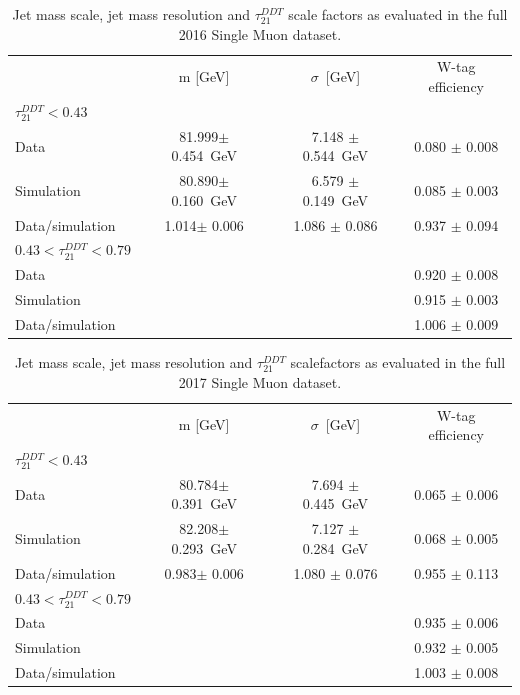 \begin{table}[htbp]
    \centering
    \begin{tabular}{|lccc|}
    \hline
    & m [GeV]           & $\sigma$~[GeV]     & W-tag efficiency\\
    $\tau_{21}^{DDT} < 0.43$ & &&\\ \hline
    \hline
    Data            & 81.999$\pm$ 0.454~GeV   & 7.148 $\pm$ 0.544~GeV & 0.080 $\pm$ 0.008\\
    Simulation      & 80.890$\pm$ 0.160~GeV   & 6.579 $\pm$ 0.149~GeV & 0.085 $\pm$ 0.003\\
    \hline
    Data/simulation & 1.014$\pm$ 0.006       & 1.086 $\pm$ 0.086     & 0.937 $\pm$ 0.094\\
    \hline
    $0.43 < \tau_{21}^{DDT} < 0.79$ & &&\\ \hline
    \hline
    Data            &    &  & 0.920 $\pm$ 0.008\\
    Simulation      &    &  & 0.915 $\pm$ 0.003\\
    \hline
    Data/simulation &    &   & 1.006 $\pm$ 0.009\\
    \hline
    \end{tabular}
     \caption{Jet mass scale, jet mass resolution and $\tau_{21}^{DDT}$ scale factors as evaluated in the full 2016 Single Muon dataset.}
    \label{tab:wsf16}
 \end{table}
 \begin{table}[htbp]
    \centering
    \begin{tabular}{|lccc|}
    \hline
    & m [GeV]           & $\sigma$~[GeV]     & W-tag efficiency\\
    $\tau_{21}^{DDT} < 0.43$ & &&\\ \hline
    \hline
    Data            & 80.784$\pm$ 0.391~GeV   & 7.694 $\pm$ 0.445~GeV & 0.065 $\pm$ 0.006\\
    Simulation      & 82.208$\pm$ 0.293~GeV   & 7.127 $\pm$ 0.284~GeV & 0.068 $\pm$ 0.005\\
    \hline
    Data/simulation & 0.983$\pm$ 0.006       & 1.080 $\pm$ 0.076     & 0.955 $\pm$ 0.113\\
    \hline
    $0.43 < \tau_{21}^{DDT} < 0.79$ & &&\\ \hline
    \hline
    Data            &    &  & 0.935 $\pm$ 0.006\\
    Simulation      &    &  & 0.932 $\pm$ 0.005\\
    \hline
    Data/simulation &    &   & 1.003 $\pm$ 0.008\\
    \hline
    \end{tabular}
    \caption{Jet mass scale, jet mass resolution and $\tau_{21}^{DDT}$ scalefactors as evaluated in the full 2017 Single Muon dataset.}
    \label{tab:wsf}
 \end{table}
